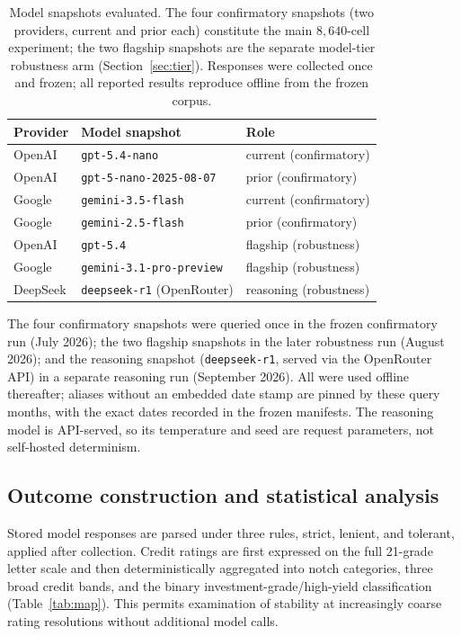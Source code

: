 \documentclass[a4paper,fleqn]{cas-sc}
\begin{document}
\begin{table}[t]\centering
\caption{Model snapshots evaluated. The four confirmatory snapshots (two providers, current and prior
each) constitute the main $8{,}640$-cell experiment; the two flagship snapshots are the separate
model-tier robustness arm (Section~\ref{sec:tier}). Responses were collected once and frozen; all
reported results reproduce offline from the frozen corpus.}\label{tab:models}
\begin{tabular}{lll}\toprule
Provider & Model snapshot & Role \\\midrule
OpenAI & \texttt{gpt-5.4-nano} & current (confirmatory) \\
OpenAI & \texttt{gpt-5-nano-2025-08-07} & prior (confirmatory) \\
Google & \texttt{gemini-3.5-flash} & current (confirmatory) \\
Google & \texttt{gemini-2.5-flash} & prior (confirmatory) \\\midrule
OpenAI & \texttt{gpt-5.4} & flagship (robustness) \\
Google & \texttt{gemini-3.1-pro-preview} & flagship (robustness) \\
DeepSeek & \texttt{deepseek-r1} (OpenRouter) & reasoning (robustness) \\\bottomrule
\end{tabular}

\vspace{3pt}
{\footnotesize\raggedright The four confirmatory snapshots were queried once in the frozen
confirmatory run (July 2026); the two flagship snapshots in the later robustness run (August 2026); and the reasoning
snapshot (\texttt{deepseek-r1}, served via the OpenRouter API) in a separate reasoning run (September 2026). All were
used offline thereafter; aliases without an embedded date stamp are pinned by these query months, with the exact dates recorded in the frozen manifests. The
reasoning model is API-served, so its temperature and seed are request parameters, not self-hosted determinism.}
\end{table}

\subsection{Outcome construction and statistical analysis}
Stored model responses are parsed under three rules, strict, lenient, and tolerant, applied after
collection. Credit ratings are first expressed on the full 21-grade letter scale and then
deterministically aggregated into notch categories, three broad credit bands, and the binary
investment-grade/high-yield classification (Table~\ref{tab:map}). This permits examination of stability at
increasingly coarse rating resolutions without additional model calls.
\end{document}
